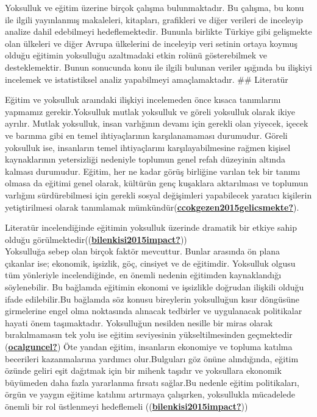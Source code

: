 \documentclass[
  12pt,
]{article}
\begin{document}
Yoksulluk ve eğitim üzerine birçok çalışma bulunmaktadır. Bu çalışma, bu konu ile ilgili yayınlanmış makaleleri, kitapları, grafikleri ve diğer verileri de inceleyip analize dahil edebilmeyi hedeflemektedir. Bununla birlikte Türkiye gibi gelişmekte olan ülkeleri ve diğer Avrupa ülkelerini de inceleyip veri setinin ortaya koymuş olduğu eğitimin yoksulluğu azaltmadaki etkin rolünü gösterebilmek ve desteklemektir. Bunun sonucunda konu ile ilgili bulunan veriler ışığında bu ilişkiyi incelemek ve istatistiksel analiz yapabilmeyi amaçlamaktadır.
\#\# Literatür

Eğitim ve yoksulluk araındaki ilişkiyi incelemeden önce kısaca tanımlarını yapmamız gerekir.Yoksulluk mutlak yoksulluk ve göreli yoksulluk olarak ikiye ayrılır. Mutlak yoksulluk, insan varlığının devamı için gerekli olan yiyecek, içecek ve barınma gibi en temel ihtiyaçlarının karşılanamaması durumudur. Göreli yoksulluk ise, insanların temel ihtiyaçlarını karşılayabilmesine rağmen kişisel kaynaklarının yetersizliği nedeniyle toplumun genel refah düzeyinin altında kalması durumudur. Eğitim, her ne kadar görüş birliğine varılan tek bir tanımı olmasa da eğitimi genel olarak, kültürün genç kuşaklara aktarılması ve toplumun varlığını sürdürebilmesi için gerekli sosyal değişimleri yapabilecek yaratıcı kişilerin yetiştirilmesi olarak tanımlamak mümkündür(\protect\hyperlink{ref-ccokgezen2015gelicsmekte}{\textbf{ccokgezen2015gelicsmekte?}}).

Literatür incelendiğinde eğitimin yoksulluk üzerinde dramatik bir etkiye sahip olduğu görülmektedir((\protect\hyperlink{ref-bilenkisi2015impact}{\textbf{bilenkisi2015impact?}}))\\
Yoksulluğa sebep olan birçok faktör mevcuttur. Bunlar arasında ön plana çıkanlar ise; ekonomik, işsizlik, göç, cinsiyet ve de eğitimdir. Yoksulluk olgusu tüm yönleriyle incelendiğinde, en önemli nedenin eğitimden kaynaklandığı söylenebilir. Bu bağlamda eğitimin ekonomi ve işsizlikle doğrudan ilişkili olduğu ifade edilebilir.Bu bağlamda söz konusu bireylerin yoksulluğun kısır döngüsüne girmelerine engel olma noktasında alınacak tedbirler ve uygulanacak politikalar hayati önem taşımaktadır. Yoksulluğun nesilden nesille bir miras olarak bırakılmamasın tek yolu ise eğitim seviyesinin yükseltilmesinden geçmektedir (\protect\hyperlink{ref-ocalguncel}{\textbf{ocalguncel?}})
Öte yandan eğitim, insanların ekonomiye ve topluma katılma becerileri kazanmalarına yardımcı olur.Bulguları göz önüne alındığında, eğitim özünde geliri eşit dağıtmak için bir mihenk taşıdır ve yoksullara ekonomik büyümeden daha fazla yararlanma fırsatı sağlar.Bu nedenle eğitim politikaları, örgün ve yaygın eğitime katılımı artırmaya çalışırken, yoksullukla mücadelede önemli bir rol üstlenmeyi hedeflemeli ((\protect\hyperlink{ref-bilenkisi2015impact}{\textbf{bilenkisi2015impact?}}))
\end{document}
